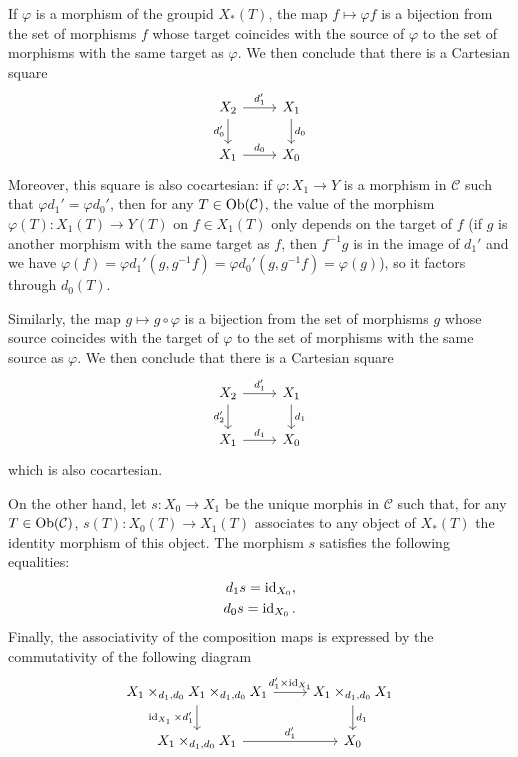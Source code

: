 If $\varphi$ is a morphism of the groupid $X_*(T)$, the map $f\mapsto\varphi f$ is a bijection from the set of morphisms $f$ whose target coincides with the source of $\varphi$ to the set of morphisms with the same target as $\varphi$. We then conclude that there is a Cartesian square
\begin{equation}\label{category groupoid square-2}
\begin{tikzcd}
X_2\ar[r,"d_1'"]\ar[d,swap,"d_0'"]&X_1\ar[d,"d_0"]\\
X_1\ar[r,"d_0"]&X_0
\end{tikzcd}
\end{equation}
Moreover, this square is also cocartesian: if $\varphi:X_1\to Y$ is a morphism in $\mathcal{C}$ such that $\varphi d_1'=\varphi d_0'$, then for any $T\in\mathrm{Ob}(\mathcal{C})$, the value of the morphism $\varphi(T):X_1(T)\to Y(T)$ on $f\in X_1(T)$ only depends on the target of $f$ (if $g$ is another morphism with the same target as $f$, then $f^{-1}g$ is in the image of $d_1'$ and we have $\varphi(f)=\varphi d_1'(g,g^{-1}f)=\varphi d_0'(g,g^{-1}f)=\varphi(g)$), so it factors through $d_0(T)$.\par

Similarly, the map $g\mapsto g\circ\varphi$ is a bijection from the set of morphisms $g$ whose source coincides with the target of $\varphi$ to the set of morphisms with the same source as $\varphi$. We then conclude that there is a Cartesian square
\begin{equation}\label{category groupoid square-3}
\begin{tikzcd}
X_2\ar[r,"d_1'"]\ar[d,swap,"d_2'"]&X_1\ar[d,"d_1"]\\
X_1\ar[r,"d_1"]&X_0
\end{tikzcd}
\end{equation}
which is also cocartesian.\par
On the other hand, let $s:X_0\to X_1$ be the unique morphis in $\mathcal{C}$ such that, for any $T\in\mathrm{Ob}(\mathcal{C})$, $s(T):X_0(T)\to X_1(T)$ associates to any object of $X_*(T)$ the identity morphism of this object. The morphism $s$ satisfies the following equalities:
\begin{align}
d_1s=\operatorname{id}_{X_0},\label{category groupoid morphism s equality-1}\\
d_0s=\operatorname{id}_{X_0}.\label{category groupoid morphism s equality-2}
\end{align}
Finally, the associativity of the composition maps is expressed by the commutativity of the following diagram
\begin{equation}\label{category groupoid square-4}
\begin{tikzcd}
X_1\times_{d_1,d_0}X_1\times_{d_1,d_0}X_1\ar[r,"d_1'\times\id_{X_1}"]\ar[d,swap,"\id_{X_1}\times d'_1"]&X_1\times_{d_1,d_0}X_1\ar[d,"d_1"]\\
X_1\times_{d_1,d_0}X_1\ar[r,"d_1'"]&X_0
\end{tikzcd}
\end{equation}

